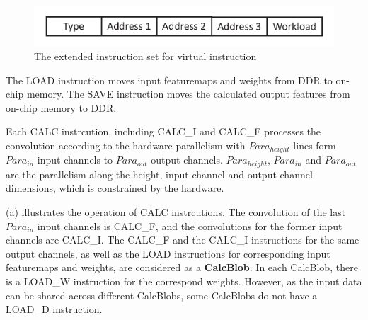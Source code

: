 \begin{figure}[h]
	\centering
	\includegraphics[width=0.9\linewidth]{fig/normal_instr.pdf}
	\caption{The extended instruction set for virtual instruction }
	\label{fig:normal_instr}
\end{figure}

The LOAD instruction moves input featuremaps and weights from DDR to on-chip memory. The SAVE instruction moves the calculated output features from on-chip memory to DDR. 

 Each CALC  instrcution,  including CALC\_I and CALC\_F processes the convolution according to the hardware parallelism with $Para_{height}$ lines form $ Para_{in} $ input channels to $ Para_{out}$ output channels. $Para_{height}$, $ Para_{in} $ and $ Para_{out} $ are the parallelism along the height, input channel and output channel dimensions, which is constrained by the hardware.

 (a) illustrates the operation of CALC instrcutions. The convolution of the last $ Para_{in} $ input channels is CALC\_F, and the convolutions for the former input channels are CALC\_I. The CALC\_F and the CALC\_I instructions for the same output channels, as well as the LOAD instructions for corresponding input featuremaps and weights, are considered as a \textbf{CalcBlob}. In each CalcBlob, there is a LOAD\_W instruction for the correspond weights. However, as the input data can be shared across different CalcBlobs, some CalcBlobs do not have a LOAD\_D instruction. 


